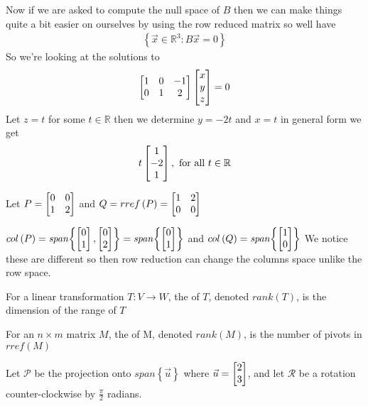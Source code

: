 \documentclass[11pt]{book}
\begin{document}
\begin{eg}
    Now if we are asked to compute the null space of $B$ then we can make things quite a bit easier on ourselves by using the row reduced matrix so well have
    \begin{gather*}
        \left\{ \vec{x} \in \mathbb{R}^3: B\vec{x} = 0 \right\}
    \end{gather*}
    So we're looking at the solutions to 
    \[
    \begin{bmatrix} 1 & 0 & -1 \\ 0 & 1 & 2 \end{bmatrix} \begin{bmatrix} x \\ y \\ z \end{bmatrix} = 0 
    \]
    Let $z = t$ for some $t \in \mathbb{R}$ then we determine $y = -2t$ and $x = t$ in general form we get
    \[
    t \begin{bmatrix} 1 \\ -2 \\ 1 \end{bmatrix}, \text{ for all  } t \in \mathbb{R}
    \]
\end{eg}

Let $P = \begin{bmatrix} 0 & 0 \\ 1 & 2 \end{bmatrix}$ and $Q = rref\left(P\right) = \begin{bmatrix} 1 & 2 \\ 0 & 0 \end{bmatrix}$

\begin{eg}
    $col\left(P\right) = \mathit{span} {\left\{ \begin{bmatrix} 0 \\ 1 \end{bmatrix}, \begin{bmatrix} 0 \\ 2 \end{bmatrix} \right\}} = \mathit{span} {\left\{ \begin{bmatrix} 0 \\ 1 \end{bmatrix} \right\}}$ and 
    $col\left(Q\right) = \mathit{span} {\left\{ \begin{bmatrix} 1 \\ 0 \end{bmatrix} \right\}} $ We notice these are different so then row reduction can change the columns space unlike the row space.
\end{eg}

\begin{defn}[Rank]\label{defn:rank}
    For a linear transformation $T : V \to W $,  the  of $T$,  denoted $rank\left(T\right)$, is the dimension of the range of $T$ 

    For an $n \times m$ matrix $M$,  the  of M, denoted $rank\left(M\right)$,  is the number of pivots in $rref\left(M\right)$ 
\end{defn}

Let $\mathcal{P}$ be the projection onto $\mathit{span} {\left\{ \vec{u} \right\}} $ where $\vec{u} = \begin{bmatrix} 2 \\ 3 \end{bmatrix}$,  and let $\mathcal{R}$ be a rotation counter-clockwise by $\frac{\pi}{2}$ radians.
\end{document}
